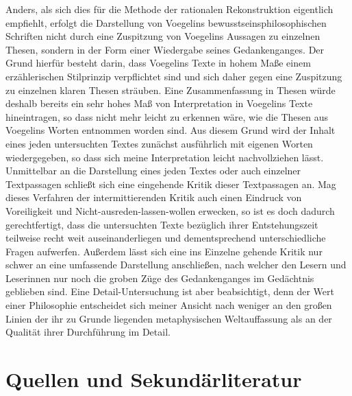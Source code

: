 Anders, als sich dies für die Methode der rationalen Rekonstruktion eigentlich
empfiehlt, erfolgt die Darstellung von Voegelins bewusstseinsphilosophischen
Schriften nicht durch eine Zuspitzung von Voegelins Aussagen zu einzelnen
Thesen, sondern in der Form einer Wiedergabe seines Gedankenganges. Der Grund
hierfür besteht darin, dass Voegelins Texte in hohem Maße einem erzählerischen
Stilprinzip verpflichtet sind und sich daher gegen eine Zuspitzung zu
einzelnen klaren Thesen sträuben. Eine Zusammenfassung in Thesen würde deshalb
bereits ein sehr hohes Maß von Interpretation in Voegelins Texte hineintragen,
so dass nicht mehr leicht zu erkennen wäre, wie die Thesen aus Voegelins
Worten entnommen worden sind. Aus diesem Grund wird der Inhalt eines jeden
untersuchten Textes zunächst ausführlich mit eigenen Worten wiedergegeben, so
dass sich meine Interpretation leicht nachvollziehen lässt. Unmittelbar an die
Darstellung eines jeden Textes oder auch einzelner Textpassagen schließt sich
eine eingehende Kritik dieser Textpassagen an. Mag dieses Verfahren der
intermittierenden Kritik auch einen Eindruck von Voreiligkeit und
Nicht-ausreden-lassen-wollen erwecken, so ist es doch dadurch gerechtfertigt,
dass die untersuchten Texte bezüglich ihrer Entstehungszeit teilweise recht
weit auseinanderliegen und dementsprechend unterschiedliche Fragen aufwerfen.
Außerdem lässt sich eine ins Einzelne gehende Kritik nur schwer an eine
umfassende Darstellung anschließen, nach welcher den Lesern und Leserinnen nur
noch die groben Züge des Gedankenganges im Gedächtnis geblieben sind. Eine
Detail-Untersuchung ist aber beabsichtigt, denn der Wert einer Philosophie
entscheidet sich meiner Ansicht nach weniger an den großen Linien der ihr zu
Grunde liegenden metaphysischen Weltauf\/fassung als an der Qualität ihrer
Durchführung im Detail.

 
\section{Quellen und Sekundärliteratur}

